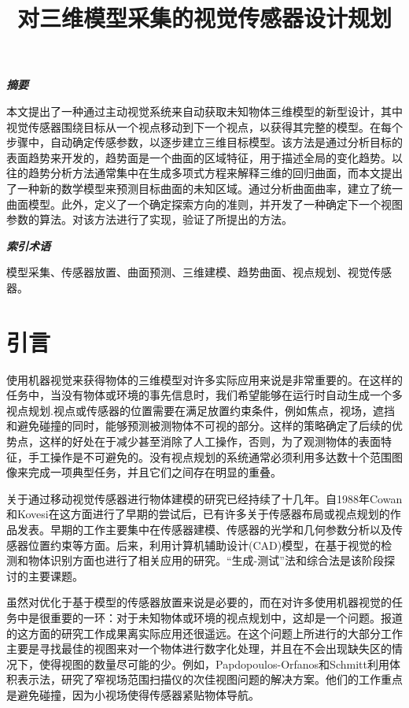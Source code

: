 \documentclass[AutoFakeBold,zihao=-4]{ctexart}
\title{\songti \bfseries \zihao{3} 对三维模型采集的视觉传感器设计规划}
\author{}
\date{}
\begin{document}
	\maketitle
	\textit{\songti \bfseries 摘要}
	
	本文提出了一种通过主动视觉系统来自动获取未知物体三维模型的新型设计，其中视觉传感器围绕目标从一个视点移动到下一个视点，以获得其完整的模型。在每个步骤中，自动确定传感参数，以逐步建立三维目标模型。该方法是通过分析目标的表面趋势来开发的，趋势面是一个曲面的区域特征，用于描述全局的变化趋势。以往的趋势分析方法通常集中在生成多项式方程来解释三维的回归曲面，而本文提出了一种新的数学模型来预测目标曲面的未知区域。通过分析曲面曲率，建立了统一曲面模型。此外，定义了一个确定探索方向的准则，并开发了一种确定下一个视图参数的算法。对该方法进行了实现，验证了所提出的方法。
	
	\textit{\songti \bfseries 索引术语}
	
	模型采集、传感器放置、曲面预测、三维建模、趋势曲面、视点规划、视觉传感器。

	\section{引言}
	使用机器视觉来获得物体的三维模型对许多实际应用来说是非常重要的。在这样的任务中，当没有物体或环境的事先信息时，我们希望能够在运行时自动生成一个多视点规划.视点或传感器的位置需要在满足放置约束条件，例如焦点，视场，遮挡和避免碰撞的同时，能够预测被测物体不可视的部分。这样的策略确定了后续的优势点，这样的好处在于减少甚至消除了人工操作，否则，为了观测物体的表面特征，手工操作是不可避免的。没有视点规划的系统通常必须利用多达数十个范围图像来完成一项典型任务，并且它们之间存在明显的重叠。
	
	关于通过移动视觉传感器进行物体建模的研究\cite{allen20033d}已经持续了十几年。自1988年Cowan和Kovesi\cite{cowan1988automatic}在这方面进行了早期的尝试后，已有许多关于传感器布局或视点规划的作品发表。早期的工作主要集中在传感器建模、传感器的光学和几何参数分析以及传感器位置约束等方面。后来，利用计算机辅助设计(CAD)模型，在基于视觉的检测和物体识别方面也进行了相关应用的研究。“生成-测试”法和综合法是该阶段探讨的主要课题。
	
	虽然对优化于基于模型的传感器放置来说是必要的\cite{chen2004automatic}，而在对许多使用机器视觉的任务中是很重要的一环：对于未知物体或环境的视点规划中，这却是一个问题。报道的这方面的研究工作成果离实际应用还很遥远。在这个问题上所进行的大部分工作主要是寻找最佳的视图来对一个物体进行数字化处理，并且在不会出现缺失区的情况下，使得视图的数量尽可能的少。例如，Papdopoulos-Orfanos和Schmitt\cite{papadopoulos1997automatic}利用体积表示法，研究了窄视场范围扫描仪的次佳视图问题的解决方案。他们的工作重点是避免碰撞，因为小视场使得传感器紧贴物体导航。
	
\end{document}
